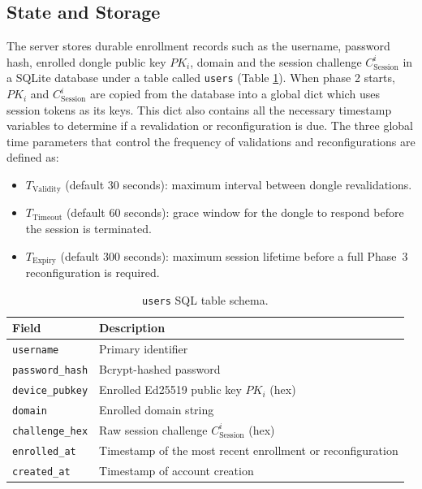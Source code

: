 \subsection{State and Storage}
The server stores durable enrollment records such as the username, password hash, enrolled dongle public key $PK_i$, domain and the session challenge $C^i_\text{Session}$ in a SQLite \cite{sqlite} database under a table called \texttt{users} (Table \ref{tab:db-schema-users}). When phase 2 starts, $PK_i$ and $C^i_\text{Session}$ are copied from the database into a global dict which uses session tokens as its keys. This dict also contains all the necessary timestamp variables to determine if a revalidation or reconfiguration is due. The three global time parameters that control the frequency of validations and reconfigurations are defined as: 
\begin{itemize}
  \item $T_{\text{Validity}}$ (default 30 seconds): maximum interval between dongle revalidations.
  \item $T_{\text{Timeout}}$ (default 60 seconds): grace window for the dongle to respond before the session is terminated.
  \item $T_{\text{Expiry}}$ (default 300 seconds): maximum session lifetime before a full Phase~3 reconfiguration is required.
\end{itemize}


\begin{table}[ht!]
\centering
\caption{\texttt{users} SQL table schema.}
\begin{tabular}{ll}
\hline
\textbf{Field} & \textbf{Description} \\
\hline
\texttt{username}      & Primary identifier \\
\texttt{password\_hash} & Bcrypt-hashed password \\
\texttt{device\_pubkey} & Enrolled Ed25519 public key $PK_i$ (hex) \\
\texttt{domain}        & Enrolled domain string \\
\texttt{challenge\_hex} & Raw session challenge $C^i_{\text{Session}}$ (hex) \\
\texttt{enrolled\_at}  & Timestamp of the most recent enrollment or reconfiguration \\
\texttt{created\_at}   & Timestamp of account creation \\
\hline
\end{tabular}
\label{tab:db-schema-users}
\end{table}

